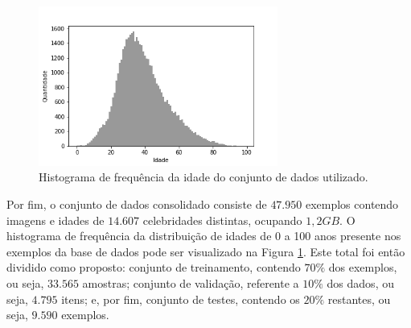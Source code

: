 \begin{figure}[!ht]
    \centering
     \includegraphics[width=0.7\textwidth]{img/idade_hist_clean}
     \caption{Histograma de frequência da idade do conjunto de dados utilizado.}
     \label{fig:hist}
\end{figure}

Por fim, o conjunto de dados consolidado consiste de $47.950$ exemplos contendo imagens e idades de $14.607$ celebridades distintas, ocupando $1,2 GB$. O histograma de frequência da distribuição de idades de 0 a 100 anos presente nos exemplos da base de dados pode ser visualizado na Figura \ref{fig:hist}. Este total foi então dividido como proposto: conjunto de treinamento, contendo $70\%$ dos exemplos, ou seja, $33.565$ amostras; conjunto de validação, referente a $10\%$ dos dados, ou seja, $4.795$ itens; e, por fim, conjunto de testes, contendo os $20\%$ restantes, ou seja, $9.590$ exemplos.
